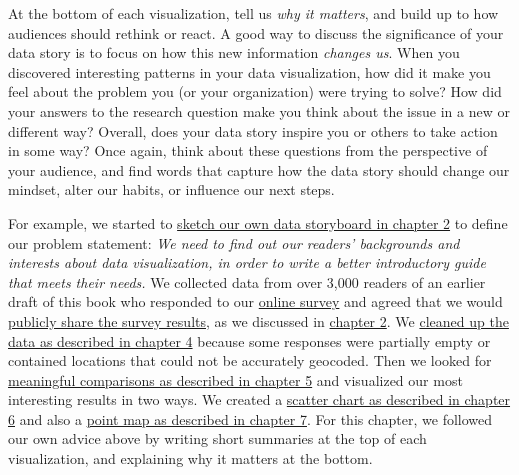 \documentclass[
  english,
]{book}
\begin{document}
At the bottom of each visualization, tell us \emph{why it matters}, and build up to how audiences should rethink or react. A good way to discuss the significance of your data story is to focus on how this new information \emph{changes us}. When you discovered interesting patterns in your data visualization, how did it make you feel about the problem you (or your organization) were trying to solve? How did your answers to the research question make you think about the issue in a new or different way? Overall, does your data story inspire you or others to take action in some way? Once again, think about these questions from the perspective of your audience, and find words that capture how the data story should change our mindset, alter our habits, or influence our next steps.

For example, we started to \href{sketch.html}{sketch our own data storyboard in chapter 2} to define our problem statement: \emph{We need to find out our readers' backgrounds and interests about data visualization, in order to write a better introductory guide that meets their needs.} We collected data from over 3,000 readers of an earlier draft of this book who responded to our \href{https://forms.gle/yn5QwTzfQkYcppQn9}{online survey} and agreed that we would \href{https://docs.google.com/spreadsheets/d/1egX_akJccnCSzdk1aaDdtrEGe5HcaTrlOW-Yf6mJ3Uo}{publicly share the survey results}, as we discussed in \href{spreadsheet.html}{chapter 2}. We \href{clean.html}{cleaned up the data as described in chapter 4} because some responses were partially empty or contained locations that could not be accurately geocoded. Then we looked for \href{comparisons.html}{meaningful comparisons as described in chapter 5} and visualized our most interesting results in two ways. We created a \href{chart.html}{scatter chart as described in chapter 6} and also a \href{map.html}{point map as described in chapter 7}. For this chapter, we followed our own advice above by writing short summaries at the top of each visualization, and explaining why it matters at the bottom.
\end{document}

